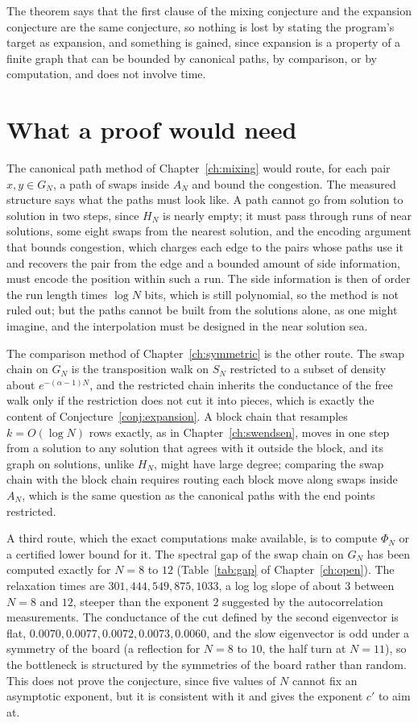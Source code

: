 The theorem says that the first clause of the mixing conjecture and the expansion conjecture are the same conjecture, so nothing is lost by stating the program's target as expansion, and something is gained, since expansion is a property of a finite graph that can be bounded by canonical paths, by comparison, or by computation, and does not involve time.

\section{What a proof would need}

The canonical path method of Chapter~\ref{ch:mixing} would route, for each pair $x, y \in G_N$, a path of swaps inside $A_N$ and bound the congestion. The measured structure says what the paths must look like. A path cannot go from solution to solution in two steps, since $H_N$ is nearly empty; it must pass through runs of near solutions, some eight swaps from the nearest solution, and the encoding argument that bounds congestion, which charges each edge to the pairs whose paths use it and recovers the pair from the edge and a bounded amount of side information, must encode the position within such a run. The side information is then of order the run length times $\log N$ bits, which is still polynomial, so the method is not ruled out; but the paths cannot be built from the solutions alone, as one might imagine, and the interpolation must be designed in the near solution sea.

The comparison method of Chapter~\ref{ch:symmetric} is the other route. The swap chain on $G_N$ is the transposition walk on $S_N$ restricted to a subset of density about $e^{-(\alpha - 1) N}$, and the restricted chain inherits the conductance of the free walk only if the restriction does not cut it into pieces, which is exactly the content of Conjecture~\ref{conj:expansion}. A block chain that resamples $k = O(\log N)$ rows exactly, as in Chapter~\ref{ch:swendsen}, moves in one step from a solution to any solution that agrees with it outside the block, and its graph on solutions, unlike $H_N$, might have large degree; comparing the swap chain with the block chain requires routing each block move along swaps inside $A_N$, which is the same question as the canonical paths with the end points restricted.

A third route, which the exact computations make available, is to compute $\Phi_N$ or a certified lower bound for it. The spectral gap of the swap chain on $G_N$ has been computed exactly for $N = 8$ to $12$ (Table~\ref{tab:gap} of Chapter~\ref{ch:open}). The relaxation times are $301, 444, 549, 875, 1033$, a log log slope of about $3$ between $N = 8$ and $12$, steeper than the exponent $2$ suggested by the autocorrelation measurements. The conductance of the cut defined by the second eigenvector is flat, $0.0070, 0.0077, 0.0072, 0.0073, 0.0060$, and the slow eigenvector is odd under a symmetry of the board (a reflection for $N = 8$ to $10$, the half turn at $N = 11$), so the bottleneck is structured by the symmetries of the board rather than random. This does not prove the conjecture, since five values of $N$ cannot fix an asymptotic exponent, but it is consistent with it and gives the exponent $c'$ to aim at.

